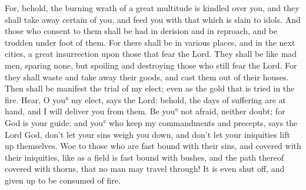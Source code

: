 {\par }{\PP {}For, behold, the burning wrath of a great multitude is kindled over you, and they shall take away certain of you, and feed you with that which is slain to idols.
And those who consent to them shall be had in derision and in reproach, and be trodden under foot of them.
For there shall be
 in various places, and in the next cities, a great insurrection upon those that fear the Lord.
They shall be like mad men, sparing none, but spoiling and destroying those who still fear the Lord.
For they shall waste and take away their goods, and cast them out of their houses.
Then shall be manifest the trial of my elect; even as the gold that is tried in the fire.
Hear, O you° my elect, says the Lord: behold, the days of suffering are at hand, and I will deliver you from them.
Be you° not afraid, neither doubt; for God is your guide:
and you° who keep my commandments and precepts, says the Lord God, don’t let your sins weigh you down, and don’t let your iniquities lift up themselves.
Woe to those who are fast bound with their sins, and covered with their iniquities, like as a field is fast bound with bushes, and the path thereof covered with thorns, that no man may travel through!
 It is even shut off, and given up to be consumed of fire.
\par }
